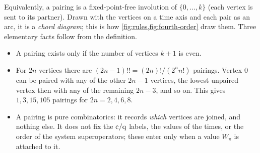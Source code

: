 Equivalently, a pairing is a fixed-point-free involution of $\{0,\dots,k\}$ (each vertex is sent to its partner).
Drawn with the vertices on a time axis and each pair as an arc, it is a \emph{chord diagram}; this is how \cref{fig:rules,fig:fourth-order} draw them.
Three elementary facts follow from the definition.
\begin{itemize}[itemsep=1pt]
\item A pairing exists only if the number of vertices $k+1$ is even.
\item For $2n$ vertices there are $(2n-1)!!=(2n)!/(2^nn!)$ pairings.
  Vertex $0$ can be paired with any of the other $2n-1$ vertices, the lowest unpaired vertex then with any of the remaining $2n-3$, and so on.
  This gives $1,3,15,105$ pairings for $2n=2,4,6,8$.
\item A pairing is pure combinatorics: it records \emph{which} vertices are joined, and nothing else.
  It does not fix the $\mathrm{c}/\mathrm{q}$ labels, the values of the times, or the order of the system superoperators; these enter only when a value $W_\pi$ is attached to it.
\end{itemize}

